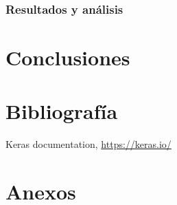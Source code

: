 \documentclass[11pt,a4paper]{article}
\begin{document}
\subsubsection{Resultados y análisis}

\section{Conclusiones}

\section{Bibliografía}
\begin{thebibliography}{9}
     Keras documentation, \url{https://keras.io/}
\end{thebibliography}

\appendix
\section{Anexos}
\end{document}
